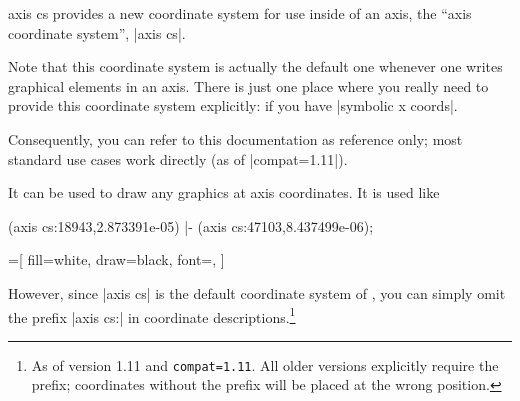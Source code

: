 \begin{coordinatesystem}{axis cs}
    \PGFPlots{} provides a new coordinate system for use inside of an axis, the
    ``axis coordinate system'', |axis cs|.

    Note that this coordinate system is actually the default one whenever one
    writes graphical elements in an axis. There is just one place where you
    really need to provide this coordinate system explicitly: if you have
    |symbolic x coords|.

    Consequently, you can refer to this documentation as reference only; most
    standard use cases work directly (as of |compat=1.11|).

    It can be used to draw any \Tikz{} graphics at axis coordinates. It is used
    like
\begin{codeexample}
\draw
       (axis cs:18943,2.873391e-05)
    |- (axis cs:47103,8.437499e-06);
\end{codeexample}

\begin{codeexample}[]
=[
    fill=white,
    draw=black,
    font=\footnotesize,
]
\end{codeexample}

    However, since |axis cs| is the default coordinate system of \PGFPlots{},
    you can simply omit the prefix |axis cs:| in coordinate
    descriptions.\footnote{As of \PGFPlots{} version 1.11 and
    \verb|compat=1.11|. All older versions explicitly require the prefix;
    coordinates without the prefix will be placed at the wrong position.}
\begin{codeexample}[]
\end{codeexample}
\end{coordinatesystem}
